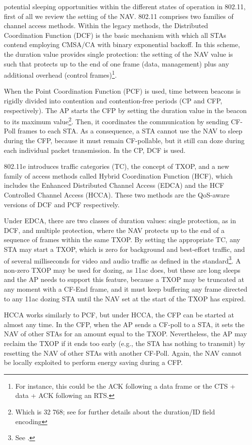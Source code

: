 \documentclass[twoside,nohyper]{tufte-book}
\begin{document}
 potential sleeping opportunities within the different states of operation in 802.11, first of all we review the setting of the NAV. 802.11 comprises two families of channel access methods. Within the legacy methods, the Distributed Coordination Function (DCF) is the basic mechanism with which all STAs contend employing CMSA/CA with binary exponential backoff. In this scheme, the duration value provides single protection: the setting of the NAV value is such that protects up to the end of one frame (data, management) plus any additional overhead (control frames)\footnote{For instance, this could be the ACK following a data frame or the CTS + data + ACK following an RTS.}.

When the Point Coordination Function (PCF) is used, time between beacons is rigidly divided into contention and contention-free periods (CP and CFP, respectively). The AP starts the CFP by setting the duration value in the beacon to its maximum value\footnote{Which is 32 768; see \citet[Table 8-3]{80211} for further details about the duration/ID field encoding}. Then, it coordinates the communication by sending CF-Poll frames to each STA. As a consequence, a STA cannot use the NAV to sleep during the CFP, because it must remain CF-pollable, but it still can doze during each individual packet transmission. In the CP, DCF is used.

802.11e introduces traffic categories (TC), the concept of TXOP, and a new family of access methods called Hybrid Coordination Function (HCF), which includes the Enhanced Distributed Channel Access (EDCA) and the HCF Controlled Channel Access (HCCA). These two methods are the QoS-aware versions of DCF and PCF respectively.

Under EDCA, there are two classes of duration values: single protection, as in DCF, and multiple protection, where the NAV protects up to the end of a sequence of frames within the same TXOP. By setting the appropriate TC, any STA may start a TXOP, which is zero for background and best-effort traffic, and of several milliseconds for video and audio traffic as defined in the standard\footnote{See \citet[Table 8-105]{80211}.}. A non-zero TXOP may be used for dozing, as 11ac does, but these are long sleeps and the AP needs to support this feature, because a TXOP may be truncated at any moment with a CF-End frame, and it must keep buffering any frame directed to any 11ac dozing STA until the NAV set at the start of the TXOP has expired.

HCCA works similarly to PCF, but under HCCA, the CFP can be started at almost any time. In the CFP, when the AP sends a CF-poll to a STA, it sets the NAV of other STAs for an amount equal to the TXOP. Nevertheless, the AP may reclaim the TXOP if it ends too early (e.g., the STA has nothing to transmit) by resetting the NAV of other STAs with another CF-Poll. Again, the NAV cannot be locally exploited to perform energy saving during a CFP.
\end{document}
